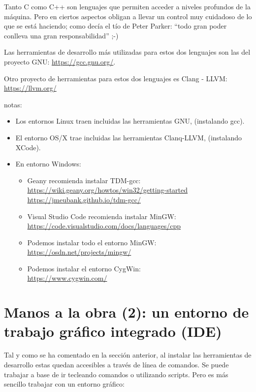 \documentclass[spanish,12pt,a4paper,final,oneside]{book}
\begin{document}
Tanto C como C++ son lenguajes que permiten acceder a niveles profundos de la máquina. Pero en ciertos aspectos obligan a llevar un control muy cuidadoso de lo que se está haciendo; como decía el tío de Peter Parker: ``todo gran poder conlleva una gran responsabilidad'' ;-)

Las herramientas de desarrollo más utilizadas para estos dos lenguajes son las del proyecto GNU: \url{https://gcc.gnu.org/}. 

Otro proyecto de herramientas para estos dos lenguajes es Clang - LLVM: \url{https://llvm.org/}

\vspace{0.5cm}
notas:
\begin{itemize}
\item Los entornos Linux traen incluidas las herramientas GNU, (instalando gcc).
\item El entorno OS/X trae incluidas las herramientas Clanq-LLVM, (instalando XCode).
\item En entorno Windows:
\begin{itemize}
\item Geany recomienda instalar TDM-gcc:
\\ \url{https://wiki.geany.org/howtos/win32/getting-started}
\\ \url{https://jmeubank.github.io/tdm-gcc/}
\item Visual Studio Code recomienda instalar MinGW:
\\ \url{https://code.visualstudio.com/docs/languages/cpp}
\item Podemos instalar todo el entorno MinGW:
\\ \url{https://osdn.net/projects/mingw/}
\item Podemos instalar el entorno CygWin:
\\ \url{https://www.cygwin.com/}
\end{itemize}
\end{itemize}



\section{Manos a la obra (2): un entorno de trabajo gráfico integrado (IDE)}\label{manos_a_la_obra_2}

Tal y como se ha comentado en la sección anterior, al instalar las herramientas de desarrollo estas quedan accesibles a través de línea de comandos. Se puede trabajar a base de ir tecleando comandos o utilizando scripts. Pero es más sencillo trabajar con un entorno gráfico:
\end{document}
